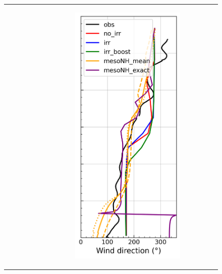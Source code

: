 \begin{figure}[hbtp]
{\begin{tabular}{@{}cccc@{}}
\begin{subfigure}[t]{0.283\textwidth}
        \end{subfigure} &
        \begin{subfigure}[t]{0.283\textwidth}
            \caption{}
            \includegraphics[width=\textwidth]{images/chap5/profiles/profile_cendrosa_wind_direction_2007_sensbins.png}

\end{subfigure}
\end{tabular}}
\end{figure}
